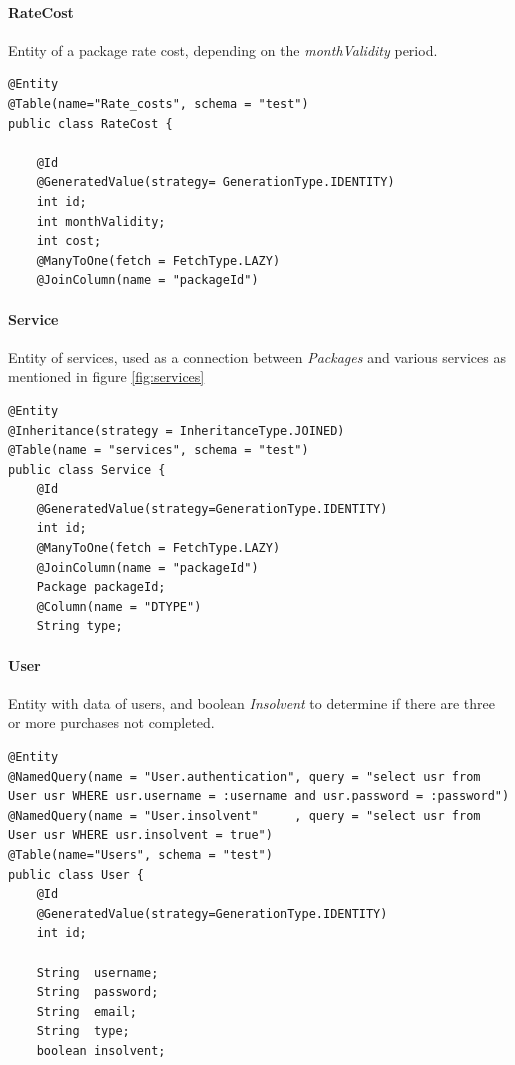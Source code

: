 \documentclass{article}
\begin{document}
\paragraph{RateCost}
Entity of a package rate cost, depending on the \emph{monthValidity} period.
\begin{lstlisting}
@Entity
@Table(name="Rate_costs", schema = "test")
public class RateCost {

    @Id
    @GeneratedValue(strategy= GenerationType.IDENTITY)
    int id;
    int monthValidity;
    int cost;
    @ManyToOne(fetch = FetchType.LAZY)
    @JoinColumn(name = "packageId")
\end{lstlisting}

\paragraph{Service}
Entity of services, used as a connection between \emph{Packages} and various services as mentioned in figure \ref{fig:services}
\begin{lstlisting}
@Entity
@Inheritance(strategy = InheritanceType.JOINED)
@Table(name = "services", schema = "test")
public class Service {
    @Id
    @GeneratedValue(strategy=GenerationType.IDENTITY)
    int id;
    @ManyToOne(fetch = FetchType.LAZY)
    @JoinColumn(name = "packageId")
    Package packageId;
    @Column(name = "DTYPE")
    String type;
  \end{lstlisting}
\newpage
\paragraph{User}
Entity with data of users, and boolean \emph{Insolvent} to determine if there are three or more purchases not completed.
\begin{lstlisting}
@Entity
@NamedQuery(name = "User.authentication", query = "select usr from User usr WHERE usr.username = :username and usr.password = :password")
@NamedQuery(name = "User.insolvent"     , query = "select usr from User usr WHERE usr.insolvent = true")
@Table(name="Users", schema = "test")
public class User {
    @Id
    @GeneratedValue(strategy=GenerationType.IDENTITY)
    int id;

    String  username;
    String  password;
    String  email;
    String  type;
    boolean insolvent;
\end{lstlisting}
\end{document}
